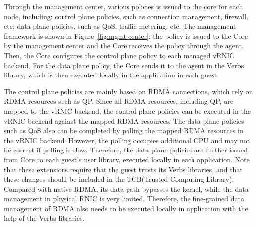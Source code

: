 
Through the management center, various policies is issued to the \sys core for each node, including: control plane policies, such as connection management, firewall, etc; data plane policies, such as QoS, traffic metering, etc. The management framework is shown in Figure~\ref{fig:mgmt-center}: the policy is issued to the \sys Core by the management center and the \sys Core receives the policy through the agent. Then, the \sys Core configures the control plane policy to each managed vRNIC backend. For the data plane policy, the \sys Core sends it to the agent in the Verbs library, which is then executed locally in the application in each guest.


The control plane policies are mainly based on RDMA connections, which rely on RDMA resources such as QP. Since all RDMA resources, including QP, are mapped to the vRNIC backend, the control plane policies can be executed in the vRNIC backend against the mapped RDMA resources. The data plane policies such as QoS also can be completed by polling the mapped RDMA resources in the vRNIC backend. However, the polling occupies additional CPU and may not be correct if polling is slow. Therefore, the data plane policies are further issued from \sys Core to each guest's user library, executed locally in each application. Note that these extensions require that the guest trusts its Verbs libraries, and that these changes should be included in the TCB(Trusted Computing Library). Compared with native RDMA, its data path bypasses the kernel, while the data management in physical RNIC is very limited. Therefore, the fine-grained data management of RDMA also needs to be executed locally in application with the help of the Verbs libraries.

